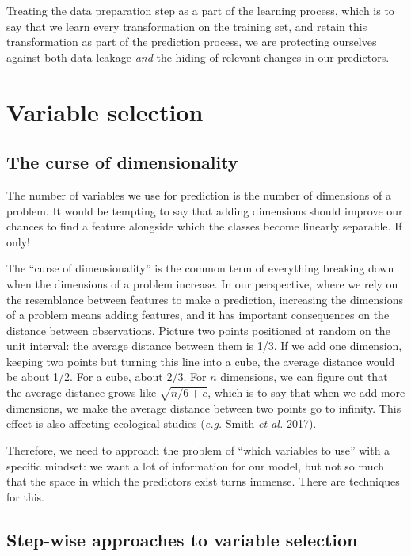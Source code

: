 \documentclass[
  letterpaper,
]{scrbook}
\begin{document}
Treating the data preparation step as a part of the learning process,
which is to say that we learn every transformation on the training set,
and retain this transformation as part of the prediction process, we are
protecting ourselves against both data leakage \emph{and} the hiding of
relevant changes in our predictors.

\section{Variable selection}\label{variable-selection}

\subsection{The curse of dimensionality}\label{sec-predictors-curse}

The number of variables we use for prediction is the number of
dimensions of a problem. It would be tempting to say that adding
dimensions should improve our chances to find a feature alongside which
the classes become linearly separable. If only!

The ``curse of dimensionality'' is the common term of everything
breaking down when the dimensions of a problem increase. In our
perspective, where we rely on the resemblance between features to make a
prediction, increasing the dimensions of a problem means adding
features, and it has important consequences on the distance between
observations. Picture two points positioned at random on the unit
interval: the average distance between them is 1/3. If we add one
dimension, keeping two points but turning this line into a cube, the
average distance would be about 1/2. For a cube, about 2/3. For \(n\)
dimensions, we can figure out that the average distance grows like
\(\sqrt{n/6 + c}\), which is to say that when we add more dimensions, we
make the average distance between two points go to infinity. This effect
is also affecting ecological studies (\emph{e.g.} Smith \emph{et al.}
2017).

Therefore, we need to approach the problem of ``which variables to use''
with a specific mindset: we want a lot of information for our model, but
not so much that the space in which the predictors exist turns immense.
There are techniques for this.

\subsection{Step-wise approaches to variable
selection}\label{step-wise-approaches-to-variable-selection}
\end{document}
